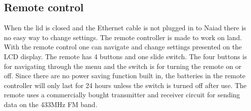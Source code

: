 \subsection{Remote control}
When the lid is closed and the Ethernet cable is not plugged in to Naiad there is no easy way to change settings. The remote controller is made to work on land. With the remote control one can navigate and change settings presented on the LCD display. The remote has 4 buttons and one slide switch. The four buttons is for navigating through the menu and the switch is for turning the remote on or off. Since there are no power saving function built in, the batteries in the remote controller will only last for 24 hours unless the switch is turned off after use. The remote uses a commercially bought transmitter and receiver circuit for sending data on the 433MHz FM band.